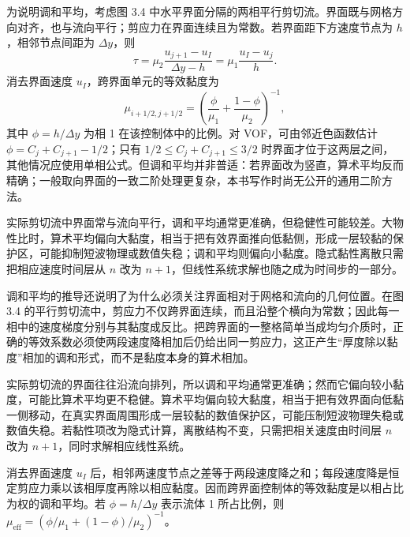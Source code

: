\documentclass[11pt,a4paper,openany,fontset=none]{ctexbook}
\newenvironment{sourceblock}
  {\par\addvspace{0.65\baselineskip}\noindent\begin{minipage}{\linewidth}\centering}
  {\end{minipage}\par\addvspace{0.48\baselineskip}}
\begin{document}
为说明调和平均，考虑图 3.4 中水平界面分隔的两相平行剪切流。界面既与网格方向对齐，也与流向平行；剪应力在界面连续且为常数。若界面距下方速度节点为 $h$，相邻节点间距为 $\Delta y$，则
\begin{equation}
 \tau=\mu_2\frac{u_{j+1}-u_I}{\Delta y-h}=\mu_1\frac{u_I-u_j}{h}. \tag{3.45}
\end{equation}
消去界面速度 $u_I$，跨界面单元的等效黏度为
\begin{equation}
 \mu_{i+1/2,j+1/2}=\left(\frac{\phi}{\mu_1}+\frac{1-\phi}{\mu_2}\right)^{-1}, \tag{3.48}
\end{equation}
其中 $\phi=h/\Delta y$ 为相 1 在该控制体中的比例。对 VOF，可由邻近色函数估计 $\phi=C_j+C_{j+1}-1/2$；只有 $1/2\le C_j+C_{j+1}\le3/2$ 时界面才位于这两层之间，其他情况应使用单相公式。但调和平均并非普适：若界面改为竖直，算术平均反而精确；一般取向界面的一致二阶处理更复杂，本书写作时尚无公开的通用二阶方法。

\begin{sourceblock}
\end{sourceblock}

实际剪切流中界面常与流向平行，调和平均通常更准确，但稳健性可能较差。大物性比时，算术平均偏向大黏度，相当于把有效界面推向低黏侧，形成一层较黏的保护区，可能抑制短波物理或数值失稳；调和平均则偏向小黏度。隐式黏性离散只需把相应速度时间层从 $n$ 改为 $n+1$，但线性系统求解也随之成为时间步的一部分。

调和平均的推导还说明了为什么必须关注界面相对于网格和流向的几何位置。在图 3.4 的平行剪切流中，剪应力不仅跨界面连续，而且沿整个横向为常数；因此每一相中的速度梯度分别与其黏度成反比。把跨界面的一整格简单当成均匀介质时，正确的等效系数必须使两段速度降相加后仍给出同一剪应力，这正产生“厚度除以黏度”相加的调和形式，而不是黏度本身的算术相加。

实际剪切流的界面往往沿流向排列，所以调和平均通常更准确；然而它偏向较小黏度，可能比算术平均更不稳健。算术平均偏向较大黏度，相当于把有效界面向低黏一侧移动，在真实界面周围形成一层较黏的数值保护区，可能压制短波物理失稳或数值失稳。若黏性项改为隐式计算，离散结构不变，只需把相关速度由时间层 $n$ 改为 $n+1$，同时求解相应线性系统。

消去界面速度 $u_I$ 后，相邻两速度节点之差等于两段速度降之和；每段速度降是恒定剪应力乘以该相厚度再除以相应黏度。因而跨界面控制体的等效黏度是以相占比为权的调和平均。若 $\phi=h/\Delta y$ 表示流体 1 所占比例，则 $\mu_{\mathrm{eff}}=(\phi/\mu_1+(1-\phi)/\mu_2)^{-1}$。
\end{document}
